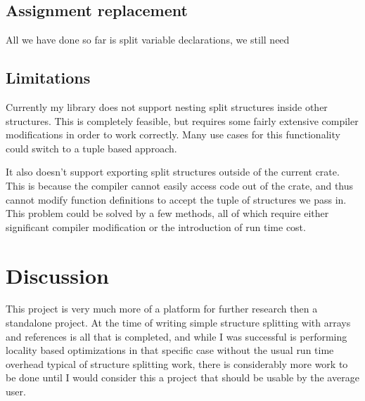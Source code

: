 \documentclass[12pt,oneside]{book}
\begin{document}


\section{Assignment replacement}
\label{sec:assign}
All we have done so far is split variable declarations, we still need

\section{Limitations}
\label{sec:limits}
Currently my library does not support nesting split structures inside other structures.
This is completely feasible, but requires some fairly extensive compiler
modifications in order to work correctly. Many use cases for this functionality
could switch to a tuple based approach.

It also doesn't support exporting split structures outside of the current crate.
This is because the compiler cannot easily access code out of the crate, and
thus cannot modify function definitions to accept the tuple of structures we
pass in. This problem could be solved by a few methods, all of which require
either significant compiler modification or the introduction of run
time cost. 

\chapter{Discussion}
\label{sec:discuss}

This project is very much more of a platform for further research then a
standalone project. At the time of writing simple structure splitting
with arrays and references is all that is completed, and 
while I was successful is performing locality based
optimizations in that specific case without the usual run time overhead typical of structure splitting
work, there is considerably more work to be done until I would consider this
a project that should be usable by the average user.


\end{document}
